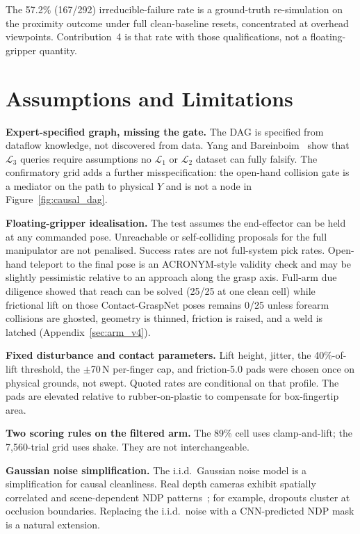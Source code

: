 \documentclass[11pt,a4paper]{report}
\begin{document}
The 57.2\% (167/292) irreducible-failure rate is a ground-truth re-simulation on the proximity outcome under full clean-baseline resets, concentrated at overhead viewpoints. Contribution~4 is that rate with those qualifications, not a floating-gripper quantity.

\section{Assumptions and Limitations}
\label{sec:limitations}

\textbf{Expert-specified graph, missing the gate.} The DAG is specified from dataflow knowledge, not discovered from data. Yang and Bareinboim~\cite{yang2025hierarchy} show that $\mathcal{L}_3$ queries require assumptions no $\mathcal{L}_1$ or $\mathcal{L}_2$ dataset can fully falsify. The confirmatory grid adds a further misspecification: the open-hand collision gate is a mediator on the path to physical $Y$ and is not a node in Figure~\ref{fig:causal_dag}.

\textbf{Floating-gripper idealisation.} The test assumes the end-effector can be held at any commanded pose. Unreachable or self-colliding proposals for the full manipulator are not penalised. Success rates are not full-system pick rates. Open-hand teleport to the final pose is an ACRONYM-style validity check and may be slightly pessimistic relative to an approach along the grasp axis. Full-arm due diligence showed that reach can be solved (25/25 at one clean cell) while frictional lift on those Contact-GraspNet poses remains 0/25 unless forearm collisions are ghosted, geometry is thinned, friction is raised, and a weld is latched (Appendix~\ref{sec:arm_v4}).

\textbf{Fixed disturbance and contact parameters.} Lift height, jitter, the 40\%-of-lift threshold, the $\pm$70\,N per-finger cap, and friction-5.0 pads were chosen once on physical grounds, not swept. Quoted rates are conditional on that profile. The pads are elevated relative to rubber-on-plastic to compensate for box-fingertip area.

\textbf{Two scoring rules on the filtered arm.} The 89\% cell uses clamp-and-lift; the 7{,}560-trial grid uses shake. They are not interchangeable.

\textbf{Gaussian noise simplification.} The i.i.d.\ Gaussian noise model is a simplification for causal cleanliness. Real depth cameras exhibit spatially correlated and scene-dependent NDP patterns~\cite{sweeney2019supervised}; for example, dropouts cluster at occlusion boundaries. Replacing the i.i.d.\ noise with a CNN-predicted NDP mask is a natural extension.
\end{document}
